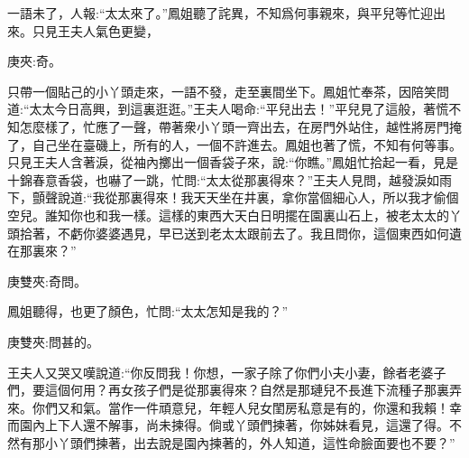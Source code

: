 \begin{parag}
    一語未了，人報:“太太來了。”鳳姐聽了詫異，不知爲何事親來，與平兒等忙迎出來。只見王夫人氣色更變，\begin{note}庚夾:奇。\end{note}只帶一個貼己的小丫頭走來，一語不發，走至裏間坐下。鳳姐忙奉茶，因陪笑問道:“太太今日高興，到這裏逛逛。”王夫人喝命:“平兒出去！”平兒見了這般，著慌不知怎麼樣了，忙應了一聲，帶著衆小丫頭一齊出去，在房門外站住，越性將房門掩了，自己坐在臺磯上，所有的人，一個不許進去。鳳姐也著了慌，不知有何等事。只見王夫人含著淚，從袖內擲出一個香袋子來，說:“你瞧。”鳳姐忙拾起一看，見是十錦春意香袋，也嚇了一跳，忙問:“太太從那裏得來？”王夫人見問，越發淚如雨下，顫聲說道:“我從那裏得來！我天天坐在井裏，拿你當個細心人，所以我才偷個空兒。誰知你也和我一樣。這樣的東西大天白日明擺在園裏山石上，被老太太的丫頭拾著，不虧你婆婆遇見，早已送到老太太跟前去了。我且問你，這個東西如何遺在那裏來？”\begin{note}庚雙夾:奇問。\end{note}鳳姐聽得，也更了顏色，忙問:“太太怎知是我的？”\begin{note}庚雙夾:問甚的。\end{note}王夫人又哭又嘆說道:“你反問我！你想，一家子除了你們小夫小妻，餘者老婆子們，要這個何用？再女孩子們是從那裏得來？自然是那璉兒不長進下流種子那裏弄來。你們又和氣。當作一件頑意兒，年輕人兒女閨房私意是有的，你還和我賴！幸而園內上下人還不解事，尚未揀得。倘或丫頭們揀著，你姊妹看見，這還了得。不然有那小丫頭們揀著，出去說是園內揀著的，外人知道，這性命臉面要也不要？”
\end{parag}


